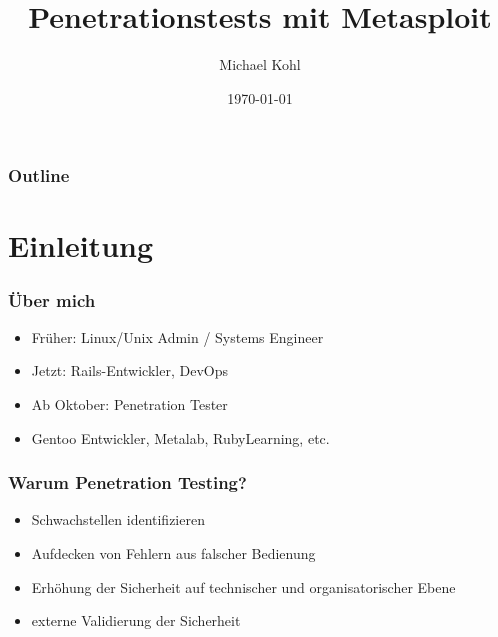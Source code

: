 \documentclass[11pt]{beamer}
\institute{Linuxwochenende 2011}
\title{Penetrationstests mit Metasploit}
\author{Michael Kohl}
\date{\today}
\begin{document}
\maketitle

\begin{frame}
\frametitle{Outline}
\setcounter{tocdepth}{3}
\tableofcontents
\end{frame}

\section{Einleitung}
\label{sec-1}
\begin{frame}[fragile]\frametitle{Über mich}
\label{sec-1-1}
\begin{itemize}

\item Früher: Linux/Unix Admin / Systems Engineer\\
\label{sec-1-1-1}%
\item Jetzt: Rails-Entwickler, DevOps\\
\label{sec-1-1-2}%
\item Ab Oktober: Penetration Tester\\
\label{sec-1-1-3}%
\item Gentoo Entwickler, Metalab, RubyLearning, etc.\\
\label{sec-1-1-4}%
\end{itemize} %
\end{frame}
\begin{frame}[fragile]\frametitle{Warum Penetration Testing?}
\label{sec-1-2}
\begin{itemize}

\item Schwachstellen identifizieren\\
\label{sec-1-2-1}%
\item Aufdecken von Fehlern aus falscher Bedienung\\
\label{sec-1-2-2}%
\item Erhöhung der Sicherheit auf technischer und organisatorischer Ebene\\
\label{sec-1-2-3}%
\item externe Validierung der Sicherheit\\
\label{sec-1-2-4}%
\end{itemize} %
\end{frame}
\end{document}
